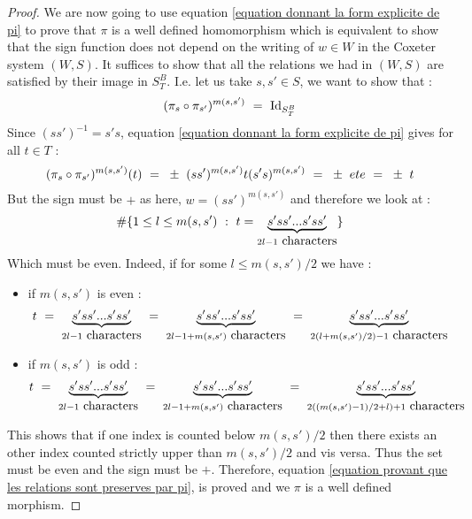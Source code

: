 \begin{proof}
		We are now going to use equation \ref{equation donnant la form explicite de pi} to prove that $\pi$ is a well defined homomorphism which is equivalent to show that the sign function does not depend on the writing of $w\in W$ in the Coxeter system $(W,S)$. It suffices to show that all the relations we had in $(W,S)$ are satisfied by their image in $S^B_T$. I.e. let us take $s,s'\in S$, we want to show that :
		\begin{equation}\label{equation provant que les relations sont preserves par pi}
		(\pi_s\circ \pi_{s'})^{m(s,s')}\text{ }=\text{ } \mbox{Id}_{S^B_T}
		\end{equation}
		Since $(ss')^{-1}=s's$, equation \ref{equation donnant la form explicite de pi} gives for all $t\in T$ :
		\begin{equation}
		(\pi_s\circ \pi_{s'})^{m(s,s')}(t)\text{ }=\text{ } \pm\text{ } (ss')^{m(s,s')}t(s's)^{m(s,s')}\text{ }=\text{ } \pm \text{ } et e\text{ }=\text{ }\pm \text{ }  t
		\end{equation}
		But the sign must be $+$ as here, $w=(ss')^{m(s,s')}$ and therefore we look at :
		\begin{equation}
		{\# \{1\leq l\leq m(s,s') \text{ }:\text{ }t=\underset{2l-1 \mbox{ characters}}{\underbrace{s'ss'...s'ss'}}\}}
		\end{equation}
		Which must be even. Indeed, if for some $l\leq m(s,s')/2$ we have :
		\begin{itemize}
			\item if $ m(s,s')$ is even :
			\begin{equation}
			t\text{ }=\text{ } \underset{2l-1 \mbox{ characters}}{\underbrace{s'ss'...s'ss'}}\text{ }=\text{ }\underset{2l-1 + m(s,s') \mbox{ characters}}{\underbrace{s'ss'...s'ss'}}\text{ }=\text{ } \underset{2(l+m(s,s')/2)-1 \mbox{ characters}}{\underbrace{s'ss'...s'ss'}}
			\end{equation}
			\item  if $ m(s,s')$ is odd :
			\begin{equation}
			t\text{ }=\text{ } \underset{2l-1 \mbox{ characters}}{\underbrace{s'ss'...s'ss'}}\text{ }=\text{ }\underset{2l-1 +m(s,s') \mbox{ characters}}{\underbrace{s'ss'...s'ss'}}\text{ }=\text{ } \underset{2((m(s,s')-1)/2+l)+1 \mbox{ characters}}{\underbrace{s'ss'...s'ss'}}
			\end{equation}
		\end{itemize}
	This shows that if one index is counted below $m(s,s')/2$ then there exists an other index counted strictly upper than $m(s,s')/2$ and vis versa. Thus the set must be even and the sign must be $+$. Therefore, equation \eqref{equation provant que les relations sont preserves par pi}, is proved and we $\pi$ is a well defined morphism.


\end{proof}
